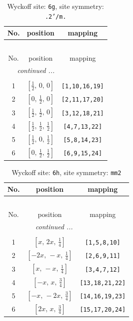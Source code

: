 \documentclass[fleqn,8pt]{jsarticle}
\begin{document}
\renewcommand{\arraystretch}{1.2}
\begin{longtable}{ccc}
\caption{Wyckoff site: {\tt 6g}, site symmetry: {\tt .2'/m.}}
 \\
 \hline \hline
No. & position & mapping \\ \hline \endfirsthead

\multicolumn{2}{l}{\tablename\ \thetable{}} \\
 \hline \hline
No. & position & mapping \\ \hline \endhead

 \hline \hline
\multicolumn{2}{r}{\footnotesize\it continued ...} \\ \endfoot

 \hline \hline
\multicolumn{2}{r}{} \\ \endlastfoot

1 & $\left[ \frac{1}{2},\, 0,\, 0 \right]$ & {\tt [1,10,16,19]} \\ \hline
2 & $\left[ 0,\, \frac{1}{2},\, 0 \right]$ & {\tt [2,11,17,20]} \\ \hline
3 & $\left[ \frac{1}{2},\, \frac{1}{2},\, 0 \right]$ & {\tt [3,12,18,21]} \\ \hline
4 & $\left[ \frac{1}{2},\, \frac{1}{2},\, \frac{1}{2} \right]$ & {\tt [4,7,13,22]} \\ \hline
5 & $\left[ \frac{1}{2},\, 0,\, \frac{1}{2} \right]$ & {\tt [5,8,14,23]} \\ \hline
6 & $\left[ 0,\, \frac{1}{2},\, \frac{1}{2} \right]$ & {\tt [6,9,15,24]} \\
\end{longtable}
\renewcommand{\arraystretch}{1.2}
\begin{longtable}{ccc}
\caption{Wyckoff site: {\tt 6h}, site symmetry: {\tt mm2}}
 \\
 \hline \hline
No. & position & mapping \\ \hline \endfirsthead

\multicolumn{2}{l}{\tablename\ \thetable{}} \\
 \hline \hline
No. & position & mapping \\ \hline \endhead

 \hline \hline
\multicolumn{2}{r}{\footnotesize\it continued ...} \\ \endfoot

 \hline \hline
\multicolumn{2}{r}{} \\ \endlastfoot

1 & $\left[ x,\, 2 x,\, \frac{1}{4} \right]$ & {\tt [1,5,8,10]} \\ \hline
2 & $\left[ - 2 x,\, - x,\, \frac{1}{4} \right]$ & {\tt [2,6,9,11]} \\ \hline
3 & $\left[ x,\, - x,\, \frac{1}{4} \right]$ & {\tt [3,4,7,12]} \\ \hline
4 & $\left[ - x,\, x,\, \frac{3}{4} \right]$ & {\tt [13,18,21,22]} \\ \hline
5 & $\left[ - x,\, - 2 x,\, \frac{3}{4} \right]$ & {\tt [14,16,19,23]} \\ \hline
6 & $\left[ 2 x,\, x,\, \frac{3}{4} \right]$ & {\tt [15,17,20,24]} \\
\end{longtable}
\end{document}
